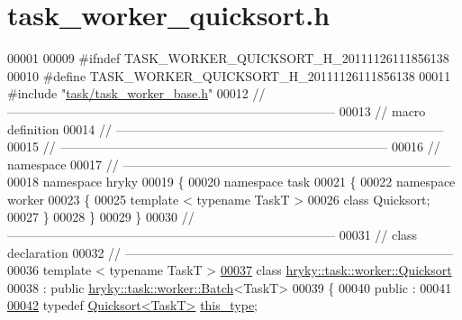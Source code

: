 \hypertarget{task__worker__quicksort_8h_source}{\section{task\-\_\-worker\-\_\-quicksort.\-h}
}

\begin{DoxyCode}
00001 
00009 \textcolor{preprocessor}{#ifndef TASK\_WORKER\_QUICKSORT\_H\_20111126111856138}
00010 \textcolor{preprocessor}{}\textcolor{preprocessor}{#define TASK\_WORKER\_QUICKSORT\_H\_20111126111856138}
00011 \textcolor{preprocessor}{}\textcolor{preprocessor}{#include "\hyperlink{task__worker__base_8h}{task/task_worker_base.h}"}
00012 \textcolor{comment}{//
      ------------------------------------------------------------------------------}
00013 \textcolor{comment}{// macro definition}
00014 \textcolor{comment}{//
      ------------------------------------------------------------------------------}
00015 \textcolor{comment}{//
      ------------------------------------------------------------------------------}
00016 \textcolor{comment}{// namespace}
00017 \textcolor{comment}{//
      ------------------------------------------------------------------------------}
00018 \textcolor{keyword}{namespace }hryky
00019 \{
00020 \textcolor{keyword}{namespace }task
00021 \{
00022 \textcolor{keyword}{namespace }worker
00023 \{
00025     \textcolor{keyword}{template} < \textcolor{keyword}{typename} TaskT >
00026     \textcolor{keyword}{class }Quicksort;
00027 \}
00028 \}
00029 \}
00030 \textcolor{comment}{//
      ------------------------------------------------------------------------------}
00031 \textcolor{comment}{// class declaration}
00032 \textcolor{comment}{//
      ------------------------------------------------------------------------------}
00036 \textcolor{comment}{}\textcolor{keyword}{template} < \textcolor{keyword}{typename} TaskT >
\hypertarget{task__worker__quicksort_8h_source_l00037}{}\hyperlink{classhryky_1_1task_1_1worker_1_1_quicksort}{00037} \textcolor{keyword}{class }\hyperlink{classhryky_1_1task_1_1worker_1_1_quicksort}{hryky::task::worker::Quicksort}
00038     : \textcolor{keyword}{public} \hyperlink{classhryky_1_1task_1_1worker_1_1_batch}{hryky::task::worker::Batch}<TaskT>
00039 \{
00040 \textcolor{keyword}{public} :
00041 
\hypertarget{task__worker__quicksort_8h_source_l00042}{}\hyperlink{classhryky_1_1task_1_1worker_1_1_quicksort_a9f519e4e780042569287c6120af6d77f}{00042}     \textcolor{keyword}{typedef} \hyperlink{classhryky_1_1task_1_1worker_1_1_quicksort}{Quicksort<TaskT>}                \hyperlink{classhryky_1_1task_1_1worker_1_1_quicksort_a9f519e4e780042569287c6120af6d77f}{this_type};

\end{DoxyCode}
